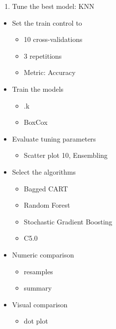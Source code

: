 \documentclass[]{book}
\providecommand{\tightlist}{%
  \setlength{\itemsep}{0pt}\setlength{\parskip}{0pt}}
\begin{document}
\begin{enumerate}
\def\labelenumi{\arabic{enumi}.}
\setcounter{enumi}{8}
\tightlist
\item
  Tune the best model: KNN
\end{enumerate}

\begin{itemize}
\tightlist
\item
  Set the train control to

  \begin{itemize}
  \tightlist
  \item
    10 cross-validations
  \item
    3 repetitions
  \item
    Metric: Accuracy
  \end{itemize}
\item
  Train the models

  \begin{itemize}
  \tightlist
  \item
    .k
  \item
    BoxCox
  \end{itemize}
\item
  Evaluate tuning parameters

  \begin{itemize}
  \tightlist
  \item
    Scatter plot
    10, Ensembling
  \end{itemize}
\item
  Select the algorithms

  \begin{itemize}
  \tightlist
  \item
    Bagged CART
  \item
    Random Forest
  \item
    Stochastic Gradient Boosting
  \item
    C5.0
  \end{itemize}
\item
  Numeric comparison

  \begin{itemize}
  \tightlist
  \item
    resamples
  \item
    summary
  \end{itemize}
\item
  Visual comparison

  \begin{itemize}
  \tightlist
  \item
    dot plot\\
  \end{itemize}
\end{itemize}
\end{document}
